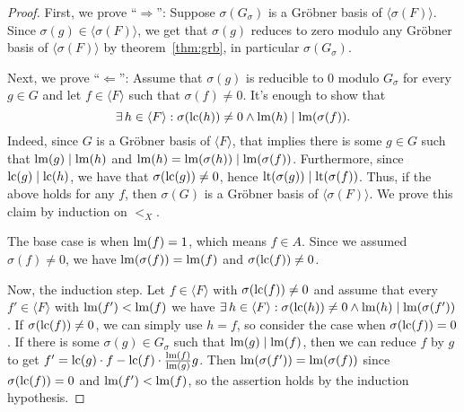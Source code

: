 \begin{proof}
  First, we prove ``$\Longrightarrow$'': Suppose $\sigma(G_{\sigma})$ is a Gröbner basis of $\langle \sigma(F) \rangle$. Since $\sigma(g) \in \langle \sigma(F) \rangle$, we get that $\sigma(g)$ reduces to zero modulo any Gröbner basis of $\langle \sigma(F) \rangle$ by theorem~\ref{thm:grb}, in particular $\sigma(G_{\sigma})$.

  Next, we prove ``$\Longleftarrow$'': Assume that $\sigma(g)$ is reducible to 0 modulo $G_{\sigma}$ for every $g \in G$ and let $f \in \langle F \rangle$ such that $\sigma(f) \neq 0$. It's enough to show that
  \[\exists\, h \in \langle F \rangle : \sigma(\operatorname{lc}(h)) \neq 0 \land \operatorname{lm}(h) \mid \operatorname{lm}(\sigma(f)).\]
  Indeed, since $G$ is a Gröbner basis of $\langle F \rangle$, that implies there is some $g \in G$ such that $\operatorname{lm}(g) \mid \operatorname{lm}(h)$ and $\operatorname{lm}(h) = \operatorname{lm}(\sigma(h)) \mid \operatorname{lm}(\sigma(f))$. Furthermore, since $\operatorname{lc}(g) \mid \operatorname{lc}(h)$, we have that $\sigma(\operatorname{lc}(g)) \neq 0$, hence $\operatorname{lt}(\sigma(g)) \mid \operatorname{lt}(\sigma(f))$. Thus, if the above holds for any $f$, then $\sigma(G)$ is a Gröbner basis of $\langle \sigma(F) \rangle$. We prove this claim by induction on $<_{X}$.

  The base case is when $\operatorname{lm}(f) = 1$, which means $f \in A$. Since we assumed $\sigma(f) \neq 0$, we have $\operatorname{lm}(\sigma(f)) = \operatorname{lm}(f)$ and $\sigma(\operatorname{lc}(f)) \neq 0$.

  Now, the induction step. Let $f \in \langle F \rangle$ with $\sigma(\operatorname{lc}(f)) \neq 0$ and assume that every $f' \in \langle F \rangle$ with $\operatorname{lm}(f') < \operatorname{lm}(f)$ we have $\exists\, h \in \langle F \rangle : \sigma(\operatorname{lc}(h)) \neq 0 \land \operatorname{lm}(h) \mid \operatorname{lm}(\sigma(f'))$. If $\sigma(\operatorname{lc}(f)) \neq 0$, we can simply use $h = f$, so consider the case when $\sigma(\operatorname{lc}(f)) = 0$. If there is some $\sigma(g) \in G_{\sigma}$ such that $\operatorname{lm}(g) \mid \operatorname{lm}(f)$, then we can reduce $f$ by $g$ to get $f' = \operatorname{lc}(g) \cdot f - \operatorname{lc}(f) \cdot \frac{\operatorname{lm}(f)}{\operatorname{lm}(g)}g$. Then $\operatorname{lm}(\sigma(f')) = \operatorname{lm}(\sigma(f))$ since $\sigma(\operatorname{lc}(f)) = 0$ and $\operatorname{lm}(f') < \operatorname{lm}(f)$, so the assertion holds by the induction hypothesis.


\end{proof}
